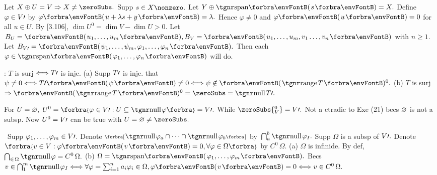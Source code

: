 \vfill{}

\vspace{4pt}

Let $X\oplus U=V\Rightarrow X\neq\zeroSubs.$ Supp $s\in X\nonzero.$ Let $Y\oplus\Span{s}=X.$\parSol{}
Define $\varphi\in V\prime$ by $\varphi\Par{u+\lambda s+y}=\lambda.$ Hence $\varphi\neq 0$ and $\varphi\Par{u}=0$ for all $u\in U.$\PfEnd\parSol{\vspace{4pt}}
\Or {} \;By [3.106], $\dim U^0=\dim V-\dim U>0.$\parSol{}
\Blind{\Or }\Or Let $B_U=\Par{u_1,\dots,u_m},B_V=\Par{u_1,\dots,u_m,v_1\dots,v_n}$ with $n\geqslant 1.$\parSol{}
\Blind{\Or}Let $B_{V\apostrophe}=\Par{\psi_1,\dots,\psi_m,\varphi_1,\dots,\varphi_n}.$ Then each $\varphi\in\Span{\varphi_1,\dots,\varphi_n}$ will do.\PfEnd\vspace{4pt}
\ACoro {}\par
{}: $T$ is surj $\Longleftrightarrow T\prime$ is inje.\parCom
(a) Supp $T\prime$ is inje. \NOTICE that $\psi\neq 0\Longleftrightarrow T\apostrophe\Par{\psi}\neq 0\Longleftrightarrow\psi\not\in\Par{\range T}{^0}.$\parCom
(b) $T$ is surj $\Rightarrow\Par{\range T}{^0}=\zeroSubs=\null T\apostrophe.$\PfEnd
\SepLine\pagebreak

\BulletPointX{}\;\;For $U=\emptySet,\;U^0=\Bra{\varphi\in V\apostrophe:U\subseteq\null\varphi}=V\apostrophe.$ While $\zeroSubs{^0_V}=V\apostrophe.$\TextB{}
Not a ctradic to Exe (21) becs $\varnothing$ is not a subsp. Now $U^0=V\prime$ can be true with $U=\emptySet\neq\zeroSubs.$\vspace{-2pt}
\SepLine

\BulletPointX{}\,\,\,Supp $\varphi_1,\dots,\varphi_m\in V\prime.$ Denote $\Sbra{\null\varphi_a\cap\cdots\cap\null\varphi_b}$ by \,$\bigcap_a^b\null\varphi_I.$\TextB{}
Supp $\Omega$ is a subsp of $V\prime.$ Denote $\Bra{v\in V:\varphi\Par{v}=0,\forall\varphi\in\Omega}$ by $C^0\,\Omega.$\TextB{\vspace{1pt}}
(a) $\Omega$ is infinide. By def, $\bigcap_{\in\,\Omega}\null\varphi=C^0\,\Omega.$\TextB{}
(b) $\Omega=\Span{\varphi_1,\dots,\varphi_m}.$ Becs $v\in\bigcap_1^m\null\varphi_I\Longleftrightarrow\forall\varphi=\sum_{i=1}^na_i\varphi_i\in\Omega,\varphi\Par{v}=0\Longleftrightarrow v\in C^0\,\Omega.$
\SepLine


